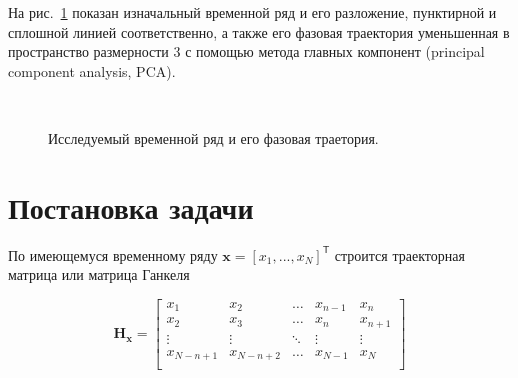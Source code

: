 \documentclass[12pt,twoside]{article}
\begin{document}
На рис.~\ref{fg:initial_traj} показан изначальный временной ряд и его разложение, пунктирной и сплошной линией соответственно, а также его фазовая траектория уменьшенная в пространство размерности 3 с помощью метода главных компонент (principal component analysis, PCA).
\begin{figure}[h]
\centering
  \\
\caption{Исследуемый временной ряд и его фазовая траетория. }
\label{fg:initial_traj}
\end{figure}

\section{Постановка задачи}
По имеющемуся временному ряду $\mathbf{x}=[x_1,...,x_N]^{\mathsf{T}}$ строится траекторная матрица или матрица Ганкеля

\begin{equation}
\mathbf{H_{x}} = 
\begin{bmatrix} 
	x_{1} & x_{2} & \ldots &x_{n-1} &x_{n}\\
	x_{2} & x_{3} & \ldots &x_{n} &x_{n+1}\\
	\vdots& \vdots & \ddots & \vdots & \vdots\\
	x_{N-n+1} & x_{N-n+2} &\ldots&x_{N-1} &x_{N}\\
\end{bmatrix}
\label{eq:hankel_matrix}
\end{equation}
\end{document}
